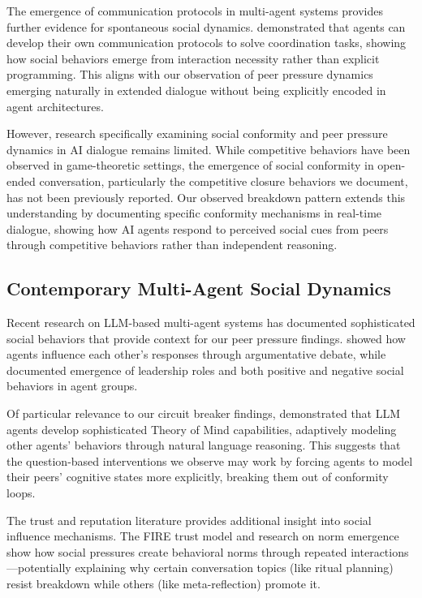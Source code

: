 \documentclass[11pt,letterpaper]{article}
\begin{document}
The emergence of communication protocols in multi-agent systems provides further evidence for spontaneous social dynamics. \citet{foerster2016learning} demonstrated that agents can develop their own communication protocols to solve coordination tasks, showing how social behaviors emerge from interaction necessity rather than explicit programming. This aligns with our observation of peer pressure dynamics emerging naturally in extended dialogue without being explicitly encoded in agent architectures.

However, research specifically examining social conformity and peer pressure dynamics in AI dialogue remains limited. While competitive behaviors have been observed in game-theoretic settings, the emergence of social conformity in open-ended conversation, particularly the competitive closure behaviors we document, has not been previously reported. Our observed breakdown pattern extends this understanding by documenting specific conformity mechanisms in real-time dialogue, showing how AI agents respond to perceived social cues from peers through competitive behaviors rather than independent reasoning.

\subsection{Contemporary Multi-Agent Social Dynamics}

Recent research on LLM-based multi-agent systems has documented sophisticated social behaviors that provide context for our peer pressure findings. \citet{du2023debate} showed how agents influence each other's responses through argumentative debate, while \citet{chen2023agentverse} documented emergence of leadership roles and both positive and negative social behaviors in agent groups.

Of particular relevance to our circuit breaker findings, \citet{li2023theory} demonstrated that LLM agents develop sophisticated Theory of Mind capabilities, adaptively modeling other agents' behaviors through natural language reasoning. This suggests that the question-based interventions we observe may work by forcing agents to model their peers' cognitive states more explicitly, breaking them out of conformity loops.

The trust and reputation literature provides additional insight into social influence mechanisms. The FIRE trust model \citep{huynh2006fire} and research on norm emergence \citep{morales2015synthesizing} show how social pressures create behavioral norms through repeated interactions—potentially explaining why certain conversation topics (like ritual planning) resist breakdown while others (like meta-reflection) promote it.
\end{document}
